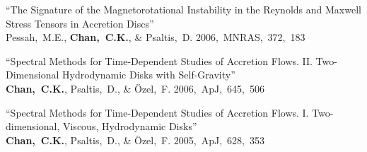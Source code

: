 \begin{ilist}
\item  ``The Signature of the Magnetorotational Instability in the Reynolds and Maxwell Stress Tensors in Accretion Discs''\\
  Pessah,~M.E., \textbf{Chan,~C.K.}, \& Psaltis,~D. 2006,~MNRAS,~372,~183

\item  ``Spectral Methods for Time-Dependent Studies of Accretion Flows. II.
  Two-Dimensional Hydrodynamic Disks with Self-Gravity''\\
  \textbf{Chan,~C.K.}, Psaltis,~D., \& \"Ozel,~F. 2006,~ApJ,~645,~506

\item  ``Spectral Methods for Time-Dependent Studies of Accretion Flows. I.
  Two-dimensional, Viscous, Hydrodynamic Disks''\\
  \textbf{Chan,~C.K.}, Psaltis,~D., \& \"Ozel,~F. 2005,~ApJ,~628,~353

\end{ilist}
